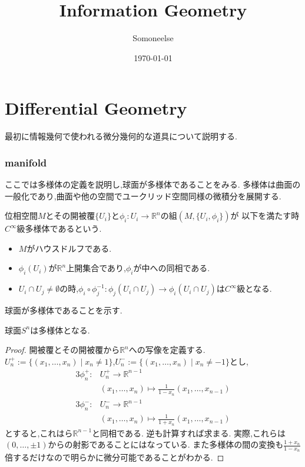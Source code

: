 \documentclass[dvipdfmx]{jarticle}
\title{Information Geometry}
\author{Somoneelse}
\date{\today}
\begin{document}
\maketitle
\tableofcontents

\maketitle
\part{Differential Geometry}
最初に情報幾何で使われる微分幾何的な道具について説明する.

\section{manifold}
ここでは多様体の定義を説明し,球面が多様体であることをみる.
多様体は曲面の一般化であり,曲面や他の空間でユークリッド空間同様の微積分を展開する.

\begin{screen}
\begin{dfn}
位相空間$M$とその開被覆$\{U_i\}$と$\phi_i:U_i \to \mathbb{R}^n$の組$(M, \{U_i, \phi_i\})$が
以下を満たす時$C^{\infty}$級多様体であるという.
\begin{itemize}
  \item $M$がハウスドルフである.
  \item $\phi_i(U_i)$が$\mathbb{R}^n$上開集合であり,$\phi_i$が中への同相である.
  \item $U_i \cap U_j \neq \emptyset$の時,$\phi_i \circ \phi_j^{-1}: \phi_j(U_i \cap U_j) \to \phi_i(U_i \cap U_j)$は$C^{\infty}$級となる.
\end{itemize}
\end{dfn}
\end{screen}

球面が多様体であることを示す.

\begin{epl}
  球面$S^n$は多様体となる.
\end{epl}
\begin{proof}
開被覆とその開被覆から$\mathbb{R}^n$への写像を定義する.
$U_n^+ := \{(x_1,\dots,x_n) \mid x_n \neq 1 \}$,$U_n^- := \{(x_1,\dots,x_n) \mid x_n \neq -1 \}$とし,
\begin{alignat}{3}
\phi_n^+: & U_n^+ \to \mathbb{R}^{n-1} \\
          & (x_1,\dots,x_n)  \mapsto \frac{1}{1 - x_n}(x_1, \ldots , x_{n-1})
\end{alignat}
\begin{alignat}{3}
\phi_n^-: & U_n^- \to \mathbb{R}^{n-1} \\
          & (x_1,\dots,x_n)  \mapsto \frac{1}{1 + x_n}(x_1, \ldots , x_{n-1})
\end{alignat}
とすると,これはら$\mathbb{R}^{n-1}$と同相である. 逆も計算すれば求まる.
実際,これらは$(0, \ldots, \pm 1)$からの射影であることにはなっている.
また多様体の間の変換も$\frac{1 + x_n}{1 - x_n}$倍するだけなので明らかに微分可能であることがわかる.
\end{proof}
\end{document}
